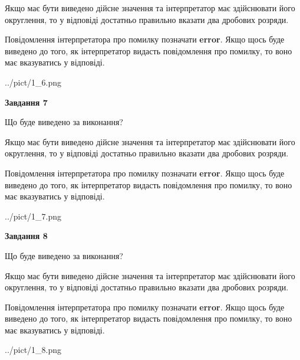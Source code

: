 \documentclass[12pt, ukrainian]{article}
\begin{document}
{\begin {Large}
Якщо має бути виведено дійсне значення та інтерпретатор має здійснювати його округлення, 
то у відповіді достатньо правильно вказати два дробових розряди.

Повідомлення інтерпретатора про помилку позначати \textbf{error}.
Якщо щось буде виведено до того, як інтерпретатор видасть повідомлення про помилку, 
то воно має вказуватись у відповіді. \par

\begin{center}
	{../pict/1_6.png}
\end{center}
\newpage

{\begin {center}\textbf{Завдання 7}\end {center}}\par
Що буде виведено за виконання? \par

Якщо має бути виведено дійсне значення та інтерпретатор має здійснювати його округлення, 
то у відповіді достатньо правильно вказати два дробових розряди.

Повідомлення інтерпретатора про помилку позначати \textbf{error}.
Якщо щось буде виведено до того, як інтерпретатор видасть повідомлення про помилку, 
то воно має вказуватись у відповіді. \par

\begin{center}
	{../pict/1_7.png}
\end{center}
\newpage

{\begin {center}\textbf{Завдання 8}\end {center}}\par
Що буде виведено за виконання? \par

Якщо має бути виведено дійсне значення та інтерпретатор має здійснювати його округлення, 
то у відповіді достатньо правильно вказати два дробових розряди.

Повідомлення інтерпретатора про помилку позначати \textbf{error}.
Якщо щось буде виведено до того, як інтерпретатор видасть повідомлення про помилку, 
то воно має вказуватись у відповіді. \par

\begin{center}
	{../pict/1_8.png}
\end{center}
\newpage


\end{Large}}
\end{document}
